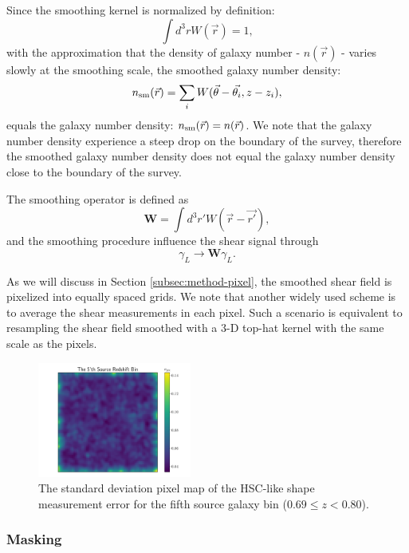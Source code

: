 \documentclass[twocolumn]{aastex62}
\begin{document}
Since the smoothing kernel is normalized by definition:
\begin{equation}
\int d^3r W(\vec{r})=1,
\end{equation}
with the approximation that the density of galaxy number - $n(\vec{r})$ -
varies slowly at the smoothing scale, the
smoothed galaxy number density:
\begin{equation}\label{eq-numDesSmooth}
n_{\rm{sm}}(\vec{r})=\sum_i W(\vec{\theta}-\vec{\theta_i},z-z_i),
\end{equation}
equals the galaxy number density: $n_{\rm{sm}}(\vec{r})=n(\vec{r})$.
We note that the galaxy number density experience a steep drop on the boundary
of the survey, therefore the smoothed galaxy number density does not equal the
galaxy number density close to the boundary of the survey.

The smoothing operator is defined as
\begin{equation}
\mathbf{W} = \int d^3 r' W(\vec{r}-\vec{r'}),
\end{equation}
and the smoothing procedure influence the shear signal through
\begin{equation}
\gamma_L \rightarrow \mathbf{W} \gamma_L.
\end{equation}

As we will discuss in Section \ref{subsec:method-pixel}, the smoothed shear
field is pixelized into equally spaced grids. We note that another widely used
scheme is to average the shear measurements in each pixel.  Such a scenario is
equivalent to resampling the shear field smoothed with a $3$-D top-hat kernel
with the same scale as the pixels.

\begin{figure}[!t]
 \centering
 \includegraphics[width=0.45\textwidth]{noise_std_map_pix.pdf}
 \caption{The standard deviation pixel map of the HSC-like shape measurement error for the fifth source galaxy bin
        ($0.69 \leq z < 0.80 $).
        } \label{fig-noistdmap}
\end{figure}

\subsubsection{Masking}
\label{subsec:method-msknoise}
\end{document}
